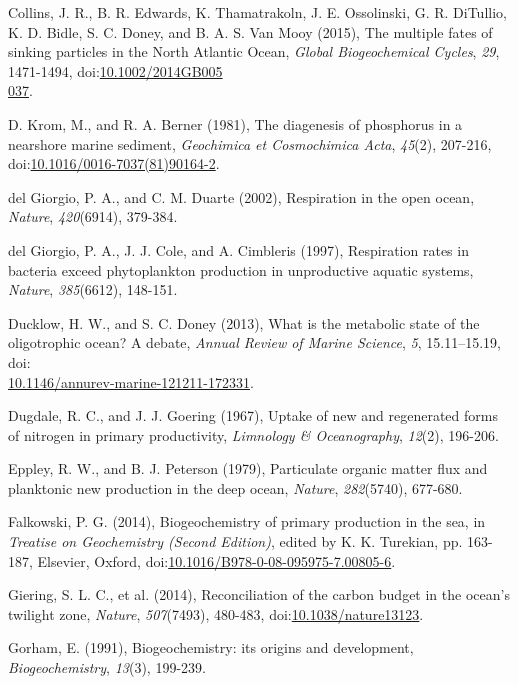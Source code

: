 \begin{singlespace}
{{Collins, J. R., B. R. Edwards, K. Thamatrakoln, J. E. Ossolinski, G. R.
DiTullio, K. D. Bidle, S. C. Doney, and B. A. S. Van Mooy (2015), The
multiple fates of sinking particles in the North Atlantic Ocean,
\emph{Global Biogeochemical Cycles}, \emph{29}, 1471-1494,
doi:\href{http://dx.doi.org/10.1002/2014GB005037}{10.1002/2014GB005\\037}.

D. Krom, M., and R. A. Berner (1981), The diagenesis of phosphorus in a
nearshore marine sediment, \emph{Geochimica et Cosmochimica Acta},
\emph{45}(2), 207-216, doi:\href{http://dx.doi.org/10.1016/0016-7037(81)90164-2}{10.1016/0016-7037(81)90164-2}.

del Giorgio, P. A., and C. M. Duarte (2002), Respiration in the open
ocean, \emph{Nature}, \emph{420}(6914), 379-384.

del Giorgio, P. A., J. J. Cole, and A. Cimbleris (1997), Respiration
rates in bacteria exceed phytoplankton production in unproductive
aquatic systems, \emph{Nature}, \emph{385}(6612), 148-151.

Ducklow, H. W., and S. C. Doney (2013), What is the metabolic state of
the oligotrophic ocean? A debate, \emph{Annual Review of Marine Science}, \emph{5},
15.11--15.19, doi:\\\href{http://dx.doi.org/10.1146/annurev-marine-121211-172331}{10.1146/annurev-marine-121211-172331}.

Dugdale, R. C., and J. J. Goering (1967), Uptake of new and regenerated forms of nitrogen in primary productivity, \emph{Limnology \& Oceanography}, \emph{12}(2), 196-206.

Eppley, R. W., and B. J. Peterson (1979), Particulate organic matter flux and planktonic new production in the deep ocean, \emph{Nature}, \emph{282}(5740), 677-680.

Falkowski, P. G. (2014), Biogeochemistry of primary production in the
sea, in \emph{Treatise on Geochemistry (Second Edition)}, edited by K.
K. Turekian, pp. 163-187, Elsevier, Oxford,
doi:\href{http://dx.doi.org/10.1016/B978-0-08-095975-7.00805-6}{10.1016/B978-0-08-095975-7.00805-6}.

Giering, S. L. C., et al. (2014), Reconciliation of the carbon budget in
the ocean's twilight zone, \emph{Nature}, \emph{507}(7493), 480-483,
doi:\href{http://dx.doi.org/10.1038/nature13123}{10.1038/nature13123}.

Gorham, E. (1991), Biogeochemistry: its origins and development, \emph{Biogeochemistry}, \emph{13}(3), 199-239.

}}
\end{singlespace}
